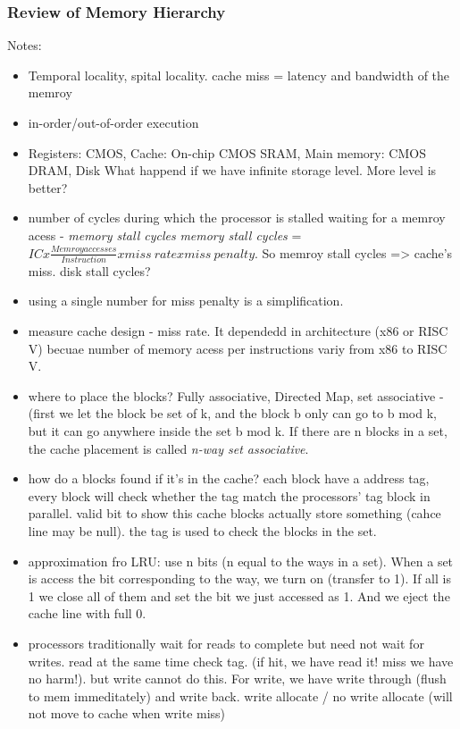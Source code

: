 \documentclass[UTF8]{article}
\begin{document}
\subsubsection{Review of Memory Hierarchy}
Notes:
\begin{itemize}
    \item Temporal locality, spital locality. cache miss = latency and bandwidth of the memroy
    \item in-order/out-of-order execution
    \item Registers: CMOS, Cache: On-chip CMOS SRAM, Main memory: CMOS DRAM, Disk What happend if we have infinite storage level. More level is better?
    \item number of cycles during which the processor is stalled waiting for a memroy acess - \emph{memory stall cycles} \emph{memory stall cycles} = $ICx\frac{Memroy accesses}{Instruction}xmiss\ rate x miss\ penalty$. So memroy stall cycles => cache's miss. disk stall cycles?
    \item using a single number for miss penalty is a simplification.
    \item measure cache design - miss rate. It dependedd in architecture (x86 or RISC V) becuae number of memory acess per instructions variy from x86 to RISC V.
    \item where to place the blocks? Fully associative, Directed Map, set associative - (first we let the block be set of k, and the block b only can go to b mod k, but it can go anywhere inside the set b mod k. If there are n blocks in a set, the cache placement is called \emph{n-way set associative}.
    \item how do a blocks found if it's in the cache? each block have a address tag, every block will check whether the tag match the processors' tag block in parallel. valid bit to show this cache blocks actually store something (cahce line may be null). the tag is used to check the blocks in the set. 
    \item approximation fro LRU: use n bits (n equal to the ways in a set). When a set is access the bit corresponding to the way, we turn on (transfer to 1). If all is 1 we close all of them and set the bit we just accessed as 1. And we eject the cache line with full 0.
    \item processors traditionally wait for reads to complete but need not wait for writes. read at the same time check tag. (if hit, we have read it! miss we have no harm!). but write cannot do this. For write, we have write through (flush to mem immeditately) and write back. write allocate / no write allocate (will not move to cache when write miss)
\end{itemize}
\end{document}
